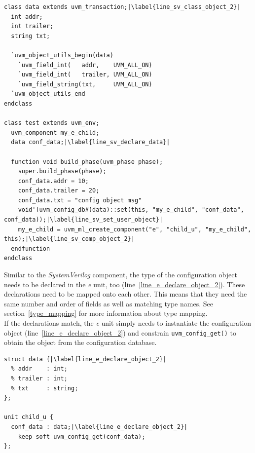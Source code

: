\lstset{language=SystemVerilog, numbers = left, escapechar=|, breaklines=true}
\begin{lstlisting}[frame=htrbl, caption={SystemVerilog: register an object in configuration database},
label={lst:SV_set_object}]
class data extends uvm_transaction;|\label{line_sv_class_object_2}|
  int addr;
  int trailer;
  string txt;
  
  `uvm_object_utils_begin(data)
    `uvm_field_int(   addr,    UVM_ALL_ON)
    `uvm_field_int(   trailer, UVM_ALL_ON)
    `uvm_field_string(txt,     UVM_ALL_ON)
  `uvm_object_utils_end
endclass

class test extends uvm_env;
  uvm_component my_e_child; 
  data conf_data;|\label{line_sv_declare_data}|
  
  function void build_phase(uvm_phase phase);
    super.build_phase(phase);
    conf_data.addr = 10;
    conf_data.trailer = 20;
    conf_data.txt = "config object msg"
    void'(uvm_config_db#(data)::set(this, "my_e_child", "conf_data", conf_data));|\label{line_sv_set_user_object}|
    my_e_child = uvm_ml_create_component("e", "child_u", "my_e_child", this);|\label{line_sv_comp_object_2}|
  endfunction
endclass
\end{lstlisting}

Similar to the \emph{SystemVerilog} component, the type of the configuration object needs to be declared in the
\textit{e} unit, too (line~\ref{line_e_declare_object_2}). These declarations need to be mapped onto each other. This
means that they need the same number and order of fields as well as matching type names. See section~\ref{type_mapping}
for more information about type mapping.\\
If the declarations match, the \textit{e} unit simply needs to instantiate the configuration object
(line~\ref{line_e_declare_object_2}) and constrain \lstinline$uvm_config_get()$ to obtain the object from the
configuration database.

\lstset{language=e, numbers = left, escapechar=|, breaklines=true}
\begin{lstlisting}[frame=htrbl, caption={e: getting an object from configuration database}, label={lst:e_get_object}]
struct data {|\label{line_e_declare_object_2}|
  % addr    : int;
  % trailer : int;
  % txt     : string;
};

unit child_u {
  conf_data : data;|\label{line_e_declare_object_2}|
    keep soft uvm_config_get(conf_data);
};
\end{lstlisting}
